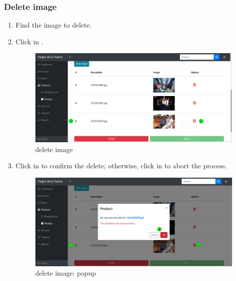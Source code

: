 \documentclass[a4paper,11pt]{refart}
\begin{document}
\subsubsection{Delete image}
\begin{enumerate}
	\item Find the image to delete.
	\item Click in .
	\begin{figure}[H]\centering
		\includegraphics[width=\textwidth]{images/image-delete.png}
		\caption{delete image}
		\label{fig:image-delete.png}
	\end{figure}
	\item Click in  to confirm the delete; otherwise, click in  to abort the process.
	\begin{figure}[H]\centering
		\includegraphics[width=\textwidth]{images/image-delete-popup.png}
		\caption{delete image: popup}
		\label{fig:image-delete-popup.png}
	\end{figure}
\end{enumerate}
\end{document}

